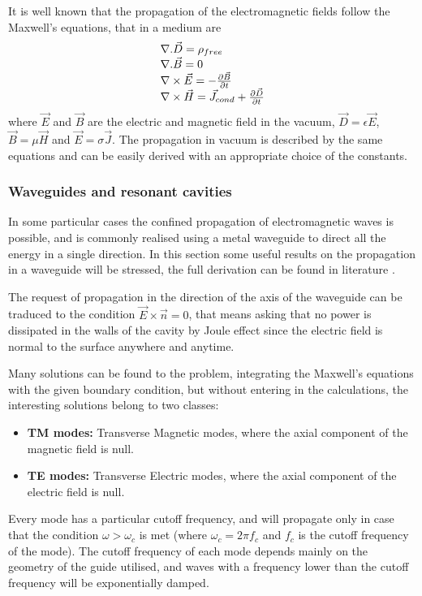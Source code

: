 It is well known that the propagation of the electromagnetic fields follow the Maxwell's equations, that in a medium are
\begin{equation}
\begin{array}{l l l l}
\nabla . \vec{D} = \rho_{free}\\
\nabla . \vec{B} = 0\\
\nabla \times \vec{E} = - \frac{\partial \vec{B}}{\partial t}\\
\nabla \times \vec{H} = \vec{J}_{cond} + \frac{\partial \vec{D}}{\partial t}
\end{array}
\end{equation}
where $\vec{E}$ and $\vec{B}$ are the electric and magnetic field in the vacuum, $\vec{D} = \epsilon \vec{E}$, $\vec{B} = \mu \vec{H}$ and $\vec{E} = \sigma \vec{J}$. The propagation in vacuum is described by the same equations and can be easily derived with an appropriate choice of the constants.

\subsubsection[Waveguides and resonant cavities]{Waveguides and resonant cavities}

In some particular cases the confined propagation of electromagnetic waves is possible, and is commonly realised using a metal waveguide to direct all the energy in a single direction. In this section some useful results on the propagation in a waveguide will be stressed, the full derivation can be found in literature \cite{Botta:EM, Jackson:ClassEM,Weiss:261732}. 

The request of propagation in the direction of the axis of the waveguide can be traduced to the condition $\vec{E} \times \vec{n} = 0$, that means asking that no power is dissipated in the walls of the cavity by Joule effect since the electric field is normal to the surface anywhere and anytime.

Many solutions can be found to the problem, integrating the Maxwell's equations with the given boundary condition, but without entering in the calculations, the interesting solutions belong to two classes:
\begin{itemize}
\item \textbf{TM modes:} Transverse Magnetic modes, where the axial component of the magnetic field is null.
\item \textbf{TE modes:} Transverse Electric modes, where the axial component of the electric field is null.
\end{itemize}
Every mode has a particular cutoff frequency, and will propagate only in case that the condition $\omega > \omega_c$ is met (where $\omega_c = 2\pi f_c$ and $f_c$ is the cutoff frequency of the mode). The cutoff frequency of each mode depends mainly on the geometry of the guide utilised, and waves with a frequency lower than the cutoff frequency will be exponentially damped.

